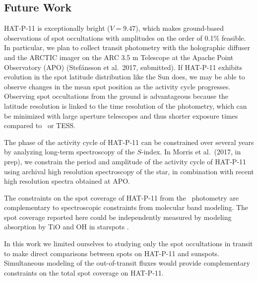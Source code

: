 \subsection{Future Work}

HAT-P-11 is exceptionally bright ($V=9.47$), which makes ground-based observations of spot occultations with amplitudes on the order of 0.1\% feasible. In particular, we plan to collect transit photometry with the holographic diffuser and the ARCTIC imager on the ARC 3.5 m Telescope at the Apache Point Observatory (APO) (Stef\'{a}nsson et al.~2017, submitted). If HAT-P-11 exhibits evolution in the spot latitude distribution like the Sun does, we may be able to observe changes in the mean spot position as the activity cycle progresses. Observing spot occultations from the ground is advantageous because the latitude resolution is linked to the time resolution of the photometry, which can be minimized with large aperture telescopes and thus shorter exposure times compared to \kepler\ or TESS.

The phase of the activity cycle of HAT-P-11 can be constrained over several years by analyzing long-term spectroscopy of the $S$-index. In Morris et al.~(2017, in prep), we constrain the period and amplitude of the activity cycle of HAT-P-11 using archival high resolution spectroscopy of the star, in combination with recent high resolution spectra obtained at APO.

The constraints on the spot coverage of HAT-P-11 from the \kepler\ photometry are complementary to spectroscopic constraints from molecular band modeling. The spot coverage reported here could be independently measured by modeling absorption by TiO and OH in starspots \citep{ONeal2001, ONeal2004}. 

In this work we limited ourselves to studying only the spot occultations in transit to make direct comparisons between spots on HAT-P-11 and sunspots. Simultaneous modeling of the out-of-transit fluxes would provide complementary constraints on the total spot coverage on HAT-P-11. 



